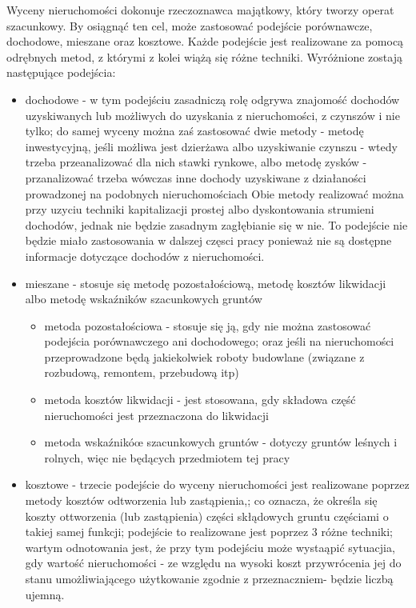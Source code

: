 \documentclass[a4paper,12pt,twoside,openany]{report}
\begin{document}
Wyceny nieruchomości dokonuje rzeczoznawca majątkowy, który tworzy  operat szacunkowy. By osiągnąć ten cel, może zastosować podejście porównawcze, dochodowe, mieszane oraz kosztowe. Każde podejście jest realizowane za pomocą odrębnych metod, z którymi z kolei wiążą się różne techniki.
Wyróżnione zostają następujące podejścia:
\begin{itemize}

\item dochodowe - w tym podejściu zasadniczą rolę odgrywa znajomość dochodów uzyskiwanych lub możliwych do uzyskania z nieruchomości, z czynszów i nie tylko; do samej wyceny można zaś zastosować dwie metody -  metodę inwestycyjną, jeśli możliwa jest dzierżawa albo uzyskiwanie czynszu - wtedy trzeba przeanalizować dla nich stawki rynkowe, albo metodę zysków - przanalizować trzeba wówczas inne dochody uzyskiwane z działaności prowadzonej na podobnych nieruchomościach
Obie metody realizować można przy uzyciu techniki kapitalizacji prostej albo dyskontowania strumieni dochodów, jednak nie będzie zasadnym zagłębianie się w nie. To podejście nie będzie miało zastosowania w dalszej częsci pracy ponieważ nie są dostępne informacje dotyczące dochodów z nieruchomości.



\item mieszane - stosuje się metodę pozostałościową, metodę kosztów likwidacji albo metodę wskaźników szacunkowych gruntów

\begin{itemize}
\item metoda pozostałościowa - stosuje się ją, gdy nie można zastosować podejścia porównawczego ani dochodowego; oraz jeśli na nieruchomości przeprowadzone będą jakiekolwiek roboty budowlane (związane z rozbudową, remontem, przebudową itp)
\item metoda kosztów likwidacji - jest stosowana, gdy składowa część nieruchomości jest przeznaczona do likwidacji
\item metoda wskaźnikóœ szacunkowych gruntów - dotyczy gruntów leśnych i rolnych, więc nie będących przedmiotem tej pracy
\end{itemize}

\item kosztowe - trzecie podejście do wyceny nieruchomości jest realizowane poprzez metody kosztów odtworzenia  lub zastąpienia,; co oznacza, że określa się koszty ottworzenia (lub zastąpienia)  części skłądowych gruntu częściami o takiej samej funkcji; podejście to realizowane jest poprzez 3 różne techniki; wartym odnotowania jest, że przy tym podejściu może wystaąpić sytuacjia, gdy wartość nieruchomości - ze względu na wysoki koszt przywrócenia jej do stanu umożliwiającego użytkowanie zgodnie z przeznaczniem- będzie liczbą ujemną.


\end{itemize}
\end{document}

